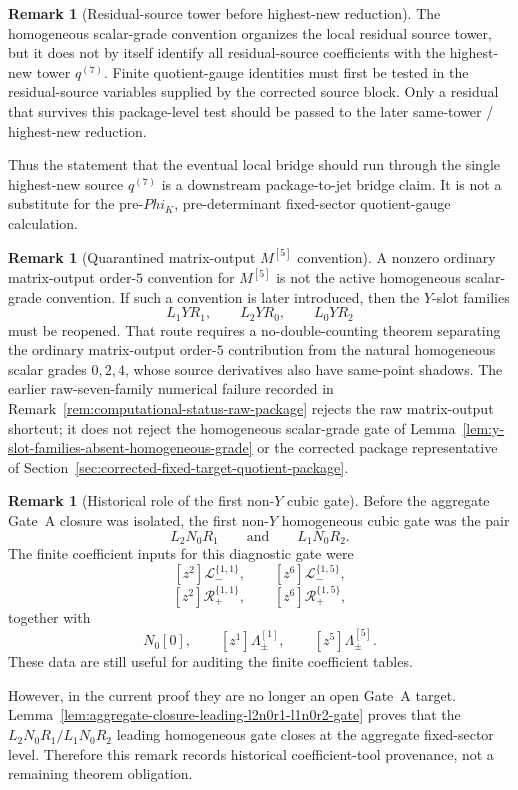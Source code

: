 \documentclass[11pt,a4paper]{amsart}
\def\Phi{Phi}%
\theoremstyle{plain}
\theoremstyle{definition}
\newtheorem{remark}[theorem]{Remark}
\begin{document}
\begin{remark}[Residual-source tower before highest-new reduction]
\label{rem:residual-source-tower-before-highest-new-reduction}
The homogeneous scalar-grade convention organizes the local residual source
tower, but it does not by itself identify all residual-source coefficients
with the highest-new tower \(q^{(7)}\).  Finite quotient-gauge identities
must first be tested in the residual-source variables supplied by the
corrected source block.  Only a residual that survives this package-level
test should be passed to the later same-tower / highest-new reduction.

Thus the statement that the eventual local bridge should run through the
single highest-new source \(q^{(7)}\) is a downstream package-to-jet bridge
claim.  It is not a substitute for the pre-\(\Phi_K\), pre-determinant
fixed-sector quotient-gauge calculation.
\end{remark}

\begin{remark}[Quarantined matrix-output \(M^{[5]}\) convention]
\label{rem:quarantined-matrix-output-M5-convention}
A nonzero ordinary matrix-output order-\(5\) convention for \(M^{[5]}\) is
not the active homogeneous scalar-grade convention.  If such a convention is
later introduced, then the \(Y\)-slot families
\[
L_1YR_1,\qquad L_2YR_0,\qquad L_0YR_2
\]
must be reopened.  That route requires a no-double-counting theorem
separating the ordinary matrix-output order-\(5\) contribution from the
natural homogeneous scalar grades \(0,2,4\), whose source derivatives also
have same-point shadows.  The earlier raw-seven-family numerical failure
recorded in Remark~\ref{rem:computational-status-raw-package} rejects the raw
matrix-output shortcut; it does not reject the homogeneous scalar-grade gate
of Lemma~\ref{lem:y-slot-families-absent-homogeneous-grade} or the
corrected package representative of
Section~\ref{sec:corrected-fixed-target-quotient-package}.
\end{remark}

\begin{remark}[Historical role of the first non-\(Y\) cubic gate]
\label{rem:first-live-non-y-cubic-gate}
Before the aggregate Gate~A closure was isolated, the first non-\(Y\)
homogeneous cubic gate was the pair
\[
L_2N_0R_1
\qquad\text{and}\qquad
L_1N_0R_2.
\]
The finite coefficient inputs for this diagnostic gate were
\[
[z^2]\mathcal L_-^{\{1,1\}},\qquad
[z^6]\mathcal L_-^{\{1,5\}},
\]
\[
[z^2]\mathcal R_+^{\{1,1\}},\qquad
[z^6]\mathcal R_+^{\{1,5\}},
\]
together with
\[
N_0[0],
\qquad
[z^1]\Lambda_\pm^{[1]},
\qquad
[z^5]\Lambda_\pm^{[5]}.
\]
These data are still useful for auditing the finite coefficient tables.

However, in the current proof they are no longer an open Gate~A target.
Lemma~\ref{lem:aggregate-closure-leading-l2n0r1-l1n0r2-gate} proves that
the \(L_2N_0R_1/L_1N_0R_2\) leading homogeneous gate closes at the
aggregate fixed-sector level.  Therefore this remark records historical
coefficient-tool provenance, not a remaining theorem obligation.
\end{remark}
\end{document}
